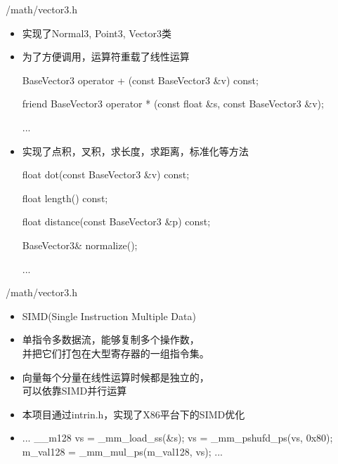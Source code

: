 \documentclass{beamer}
\begin{document}
\begin{frame} {/math/vector3.h}
\begin{itemize}
\item 实现了Normal3, Point3, Vector3类
\item 为了方便调用，运算符重载了线性运算
\begin{semiverbatim} \small BaseVector3 operator + (const BaseVector3 \&v) const; \end{semiverbatim}
\begin{semiverbatim} \small friend BaseVector3 operator * (const float \&s, const BaseVector3 \&v); \end{semiverbatim}
\begin{semiverbatim} \small ... \end{semiverbatim}
\item 实现了点积，叉积，求长度，求距离，标准化等方法
\begin{semiverbatim} \small float dot(const BaseVector3 \&v) const; \end{semiverbatim}
\begin{semiverbatim} \small float length() const; \end{semiverbatim}
\begin{semiverbatim} \small float distance(const BaseVector3 \&p) const; \end{semiverbatim}
\begin{semiverbatim} \small BaseVector3\& normalize(); \end{semiverbatim}
\begin{semiverbatim} \small ... \end{semiverbatim}
\end{itemize}
\end{frame}

\begin{frame} {/math/vector3.h}
\begin{itemize}
\item SIMD(Single Instruction Multiple Data)
\item 单指令多数据流，能够复制多个操作数，\\并把它们打包在大型寄存器的一组指令集。
\item 向量每个分量在线性运算时候都是独立的，\\ 可以依靠SIMD并行运算
\item 本项目通过intrin.h，实现了X86平台下的SIMD优化
\item \begin{semiverbatim} ... \newline \_\_m128 vs = \_mm\_load\_ss(\&s); \newline vs = \_mm\_pshufd\_ps(vs, 0x80); \newline m\_val128 = \_mm\_mul\_ps(m\_val128, vs); \newline ... \end{semiverbatim}
\end{itemize}
\end{frame}
\end{document}

